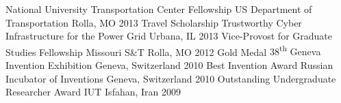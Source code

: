 \begin{cvhonors}
  \cvhonor
    {National University Transportation Center Fellowship}
    {US Department of Transportation}
    {Rolla, MO}
    {2013}
  \cvhonor
    {Travel Scholarship}
    {Trustworthy Cyber Infrastructure for the Power Grid}
    {Urbana, IL}
    {2013}
  \cvhonor
    {Vice-Provost for Graduate Studies Fellowship}
    {Missouri S\&T}
    {Rolla, MO}
    {2012}
  \cvhonor
    {Gold Medal}
    {38\textsuperscript{th} Geneva Invention Exhibition}
    {Geneva, Switzerland}
    {2010}
  \cvhonor
    {Best Invention Award}
    {Russian Incubator of Inventions}
    {Geneva, Switzerland}
    {2010}
  \cvhonor
    {Outstanding Undergraduate Researcher Award}
    {IUT}
    {Isfahan, Iran}
    {2009}
\end{cvhonors}